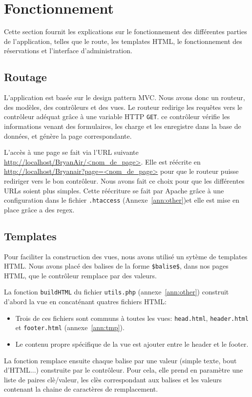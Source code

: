 \documentclass[12pt,a4paper]{article}
\begin{document}
	\section{Fonctionnement}
		Cette section fournit les explications sur le fonctionnement des différentes parties de l'application, telles que le route, les templates HTML, le fonctionnement des réservations et l'interface d'adminis\-tration.
		\subsection{Routage}
		L'application est basée sur le design pattern MVC. Nous avons donc un routeur, des modèles, des contrôleurs et des vues. Le routeur redirige les requêtes vers le contrôleur adéquat grâce à une variable HTTP \texttt{GET}. ce contrôleur vérifie les informations venant des formulaires, les charge et les enregistre dans la base de données, et génère la page correspondante.

		L'accès à une page se fait via l'URL suivante \url{http://localhost/BryanAir/<nom_de_page>}. Elle est réécrite en \url{http://localhost/Bryanair?page=<nom_de_page>} pour que le routeur puisse rediriger vers le bon contrôleur. Nous avons fait ce choix pour que les différentes URLs soient plus simples. Cette réécriture se fait par Apache grâce à une configuration dans le fichier \texttt{.htaccess} (Annexe~\ref{ann:other})et elle est mise en place grâce a des regex.

		\subsection{Templates}
		Pour faciliter la construction des vues, nous avons utilisé un sytème de templates HTML. Nous avons placé des balises de la forme \texttt{\$balise\$}, dans nos pages HTML, que le contrôleur remplace par des valeurs.

    La fonction \texttt{buildHTML} du fichier \texttt{utils.php} (annexe~\ref{ann:other}) construit d'abord la vue en concaté\-nant quatres fichiers HTML:
    \begin{itemize}
      \item Trois de ces fichiers sont communs à toutes les vues: \texttt{head.html}, \texttt{header.html} et \texttt{footer.html} (annexe~\ref{ann:tmp}).
      \item Le contenu propre spécifique de la vue est ajouter entre le header et le footer.
    \end{itemize}

		La fonction remplace ensuite chaque balise par une valeur (simple texte, bout d'HTML...) construite par le contrôleur. Pour cela, elle prend en paramètre une liste de paires clè/valeur, les clès correspondant aux balises et les valeurs contenant la chaine de caractères de remplacement.
\end{document}
